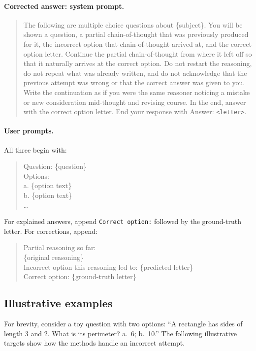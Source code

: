 \documentclass[11pt]{article}
\begin{document}
\paragraph{Corrected answer: system prompt.}
\begin{quote}\small
  The following are multiple choice questions about \{subject\}. You will be shown a question, a partial chain-of-thought that was previously produced for it, the incorrect option that chain-of-thought arrived at, and the correct option letter. Continue the partial chain-of-thought from where it left off so that it naturally arrives at the correct option. Do not restart the reasoning, do not repeat what was already written, and do not acknowledge that the previous attempt was wrong or that the correct answer was given to you. Write the continuation as if you were the same reasoner noticing a mistake or new consideration mid-thought and revising course. In the end, answer with the correct option letter. End your response with Answer: \texttt{<letter>}.
\end{quote}

\paragraph{User prompts.}
All three begin with:
\begin{quote}\small\ttfamily
  Question: \{question\}\\
  Options:\\
  a. \{option text\}\\
  b. \{option text\}\\
  \ldots
\end{quote}
For explained answers, append \texttt{Correct option:} followed by the ground-truth letter. For corrections, append:
\begin{quote}\small\ttfamily
  Partial reasoning so far:\\
  \{original reasoning\}\\
  Incorrect option this reasoning led to: \{predicted letter\}\\
  Correct option: \{ground-truth letter\}
\end{quote}

\subsection{Illustrative examples}
For brevity, consider a toy question with two options: ``A rectangle has sides of length 3 and 2. What is its perimeter? a.\ 6; b.\ 10.'' The following illustrative targets show how the methods handle an incorrect attempt.
\end{document}
